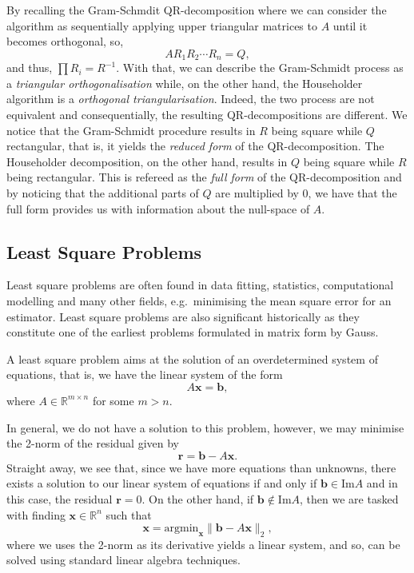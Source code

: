 \documentclass[
]{article}
\theoremstyle{definition}
\theoremstyle{definition}
\begin{document}
By recalling the Gram-Schmdit QR-decomposition where we can consider the
algorithm as sequentially applying upper triangular matrices to \(A\)
until it becomes orthogonal, so, \[A R_1 R_2 \cdots R_n = Q,\] and thus,
\(\prod R_i = R^{-1}\). With that, we can describe the Gram-Schmidt
process as a \emph{triangular orthogonalisation} while, on the other
hand, the Householder algorithm is a \emph{orthogonal
triangularisation}. Indeed, the two process are not equivalent and
consequentially, the resulting QR-decompositions are different. We
notice that the Gram-Schmidt procedure results in \(R\) being square
while \(Q\) rectangular, that is, it yields the \emph{reduced form} of
the QR-decomposition. The Householder decomposition, on the other hand,
results in \(Q\) being square while \(R\) being rectangular. This is
refereed as the \emph{full form} of the QR-decomposition and by noticing
that the additional parts of \(Q\) are multiplied by 0, we have that the
full form provides us with information about the null-space of \(A\).

\hypertarget{least-square-problems}{%
\subsection{Least Square Problems}\label{least-square-problems}}

Least square problems are often found in data fitting, statistics,
computational modelling and many other fields, e.g.~minimising the mean
square error for an estimator. Least square problems are also
significant historically as they constitute one of the earliest problems
formulated in matrix form by Gauss.

A least square problem aims at the solution of an overdetermined system
of equations, that is, we have the linear system of the form
\[A\mathbf{x} = \mathbf{b},\] where \(A \in \mathbb{R}^{m \times n}\)
for some \(m > n\).

In general, we do not have a solution to this problem, however, we may
minimise the 2-norm of the residual given by
\[\mathbf{r} = \mathbf{b} - A\mathbf{x}.\] Straight away, we see that,
since we have more equations than unknowns, there exists a solution to
our linear system of equations if and only if
\(\mathbf{b} \in \text{Im}A\) and in this case, the residual
\(\mathbf{r} = 0\). On the other hand, if
\(\mathbf{b} \notin \text{Im}A\), then we are tasked with finding
\(\mathbf{x} \in \mathbb{R}^n\) such that
\[\mathbf{x} = \text{argmin}_\mathbf{x} \| \mathbf{b} - A\mathbf{x} \|_2,\]
where we uses the 2-norm as its derivative yields a linear system, and
so, can be solved using standard linear algebra techniques.
\end{document}

